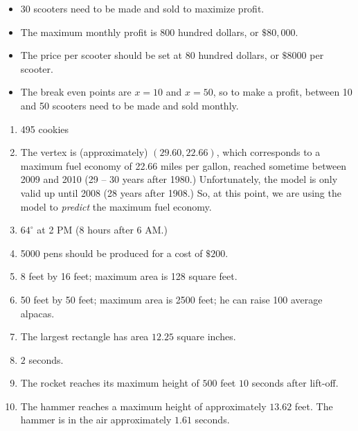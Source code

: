 \begin{enumerate}
\begin{itemize}
\item  $30$ scooters need to be made and sold to maximize profit.

\item  The maximum monthly profit is $800$ hundred dollars, or $\$80,\!000$.

\item The price per scooter should be set at $80$ hundred dollars, or $\$8000$ per scooter.

\item  The break even points are $x=10$ and $x=50$, so to make a profit, between 10 and 50 scooters  need to be made and sold monthly.

\end{itemize}

\setcounter{HW}{\value{enumi}}
\end{enumerate}

\begin{enumerate}
\setcounter{enumi}{\value{HW}}


\item 495 cookies

\item The vertex is (approximately) $(29.60, 22.66)$, which corresponds to a maximum fuel economy of 22.66 miles per gallon, reached sometime between 2009 and 2010 (29 -- 30 years after 1980.)  Unfortunately, the model is only valid up until 2008 (28 years after 1908.)  So, at this point, we are using the model to \textit{predict} the maximum fuel economy.



\item  $64^{\circ}$ at 2 PM (8 hours after 6 AM.)

\item  5000 pens should be produced for a cost of $\$200$.

\item 8 feet by 16 feet; maximum area is 128 square feet.

\item 50 feet by 50 feet;  maximum area is 2500 feet;  he can raise 100 average alpacas. 

\item The largest rectangle has area $12.25$ square inches.


\item  $2$ seconds.


\item  The rocket reaches its maximum height of $500$ feet $10$ seconds after lift-off.


\item  The hammer reaches a maximum height of approximately $13.62$ feet.  The hammer is in the air approximately $1.61$ seconds.  

\setcounter{HW}{\value{enumi}}
\end{enumerate}


